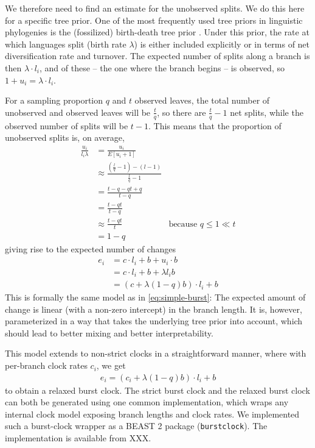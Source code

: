 \documentclass[]{rsos}%
\begin{document}
We therefore need to find an estimate for the unobserved splits.
We do this here for a specific tree prior.
One of the most frequently used tree priors in linguistic phylogenies
is the (fossilized) birth-death tree prior \parencite{gernhard2008conditioned,stadler2010samplingthroughtime,heath2014fossilized}.
Under this prior, the rate at which
languages split (birth rate $\lambda$) is either included explicitly or in terms of net diversification rate and turnover.
The expected number of splits along a branch is then $\lambda \cdot l_i$, and of these – the one where the branch begins – is observed, so $1 + u_i = \lambda \cdot l_i$.

For a sampling proportion $q$ and $t$ observed leaves, the total number of unobserved and observed leaves will be
$\frac{t}{q}$, so there are $\frac{t}{q} - 1$ net splits,
while the observed number of splits will be $t - 1$. This means that the proportion of unobserved splits is, on average,
\begin{align}
    \frac{u_i}{l_i \lambda} &= \frac{u_i}{E[u_i + 1]} \\
    & \approx \frac{(\frac{l}{q} - 1) - (l - 1)}{\frac{l}{q} -1} \\
    & = \frac{t - q - qt + q}{t - q} \\
    & = \frac{t - qt}{t - q} \\
    & \approx \frac{t - qt}{t} &\text{because } q \leq 1 \ll t \\
    & = 1 - q
\end{align}
giving rise to the expected number of changes
\begin{align}
  e_i &= c \cdot l_i + b + u_i \cdot b  \\
  &= c \cdot l_i + b + \lambda l_i b \\
  &= (c + \lambda (1-q) b) \cdot l_i + b
  \label{eq:reparam-burst}
\end{align}
This is formally the same model as in \cref{eq:simple-burst}: The expected amount of change is linear (with a non-zero intercept) in the branch length. It is, however, parameterized
in a way that takes the underlying tree prior into account,
which should lead to better mixing and better interpretability.

This model extends to non-strict clocks in a straightforward manner, where with per-branch clock rates $c_i$, we get
\begin{align}
  e_i = (c_i + \lambda (1-q) b) \cdot l_i + b
  \label{eq:relaxed}
\end{align}
to obtain a relaxed burst clock.
The strict burst clock and the relaxed burst clock can both be generated using one common implementation, which wraps any internal clock model exposing branch lengths and clock rates.
We implemented such a burst-clock wrapper as a BEAST 2 package (\texttt{burstclock}).
The implementation is available from XXX.
\end{document}
